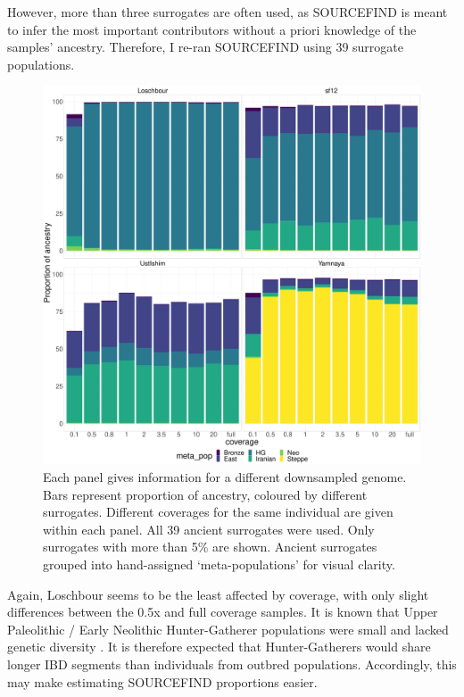 However, more than three surrogates are often used, as SOURCEFIND is meant to infer the most important contributors without a priori knowledge of the samples' ancestry. Therefore, I re-ran SOURCEFIND using 39 surrogate populations. 

\begin{figure}[htp]
    \centering
    \includegraphics[width=1.0\textwidth]{../images/chapter1/Allpops_SF_downsampled.pdf}
    \caption{Each panel gives information for a different downsampled genome. Bars represent proportion of ancestry, coloured by different surrogates. Different coverages for the same individual are given within each panel. All 39 ancient surrogates were used. Only surrogates with more than 5\% are shown. Ancient surrogates grouped into hand-assigned `meta-populations' for visual clarity. }
    \label{fig:SOURCEFIND_AllPSop_downsampled}
\end{figure}

Again, Loschbour seems to be the least affected by coverage, with only slight differences between the 0.5x and full coverage samples. It is known that Upper Paleolithic / Early Neolithic Hunter-Gatherer populations were small and lacked genetic diversity \cite{excoffier1999hunter, Lazaridis2014, Fu2016}. It is therefore expected that Hunter-Gatherers would share longer IBD segments than individuals from outbred populations. Accordingly, this may make estimating SOURCEFIND proportions easier.


